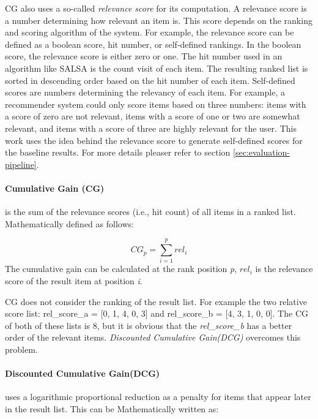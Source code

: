 CG also uses a so-called \emph{relevance score} for its computation. A relevance score is a number determining how relevant an item is. This score depends on the ranking and scoring algorithm of the system. For example, the relevance score can be defined as a boolean score, hit number, or self-defined rankings. In the boolean score, the relevance score is either zero or one. The hit number used in an algorithm like SALSA \cite{lempelSALSAStochasticApproach2001} is the count visit of each item. The resulting ranked list is sorted in descending order based on the hit number of each item. Self-defined scores are numbers determining the relevancy of each item. For example, a recommender system could only score items based on three numbers: items with a score of zero are not relevant, items with a score of one or two are somewhat relevant, and items with a score of three are highly relevant for the user. This work uses the idea behind the relevance score to generate self-defined scores for the baseline results. For more details pleaser refer to section \ref{sec:evaluation-pipeline}.


\paragraph*{Cumulative Gain (CG)}
is the sum of the relevance scores (i.e., hit count) of all items in a ranked list. Mathematically defined as follows:

\begin{equation}
    CG_p = \sum_{i=1}^{p}rel_i
    \label{eq:cg}
\end{equation}
The cumulative gain can be calculated at the rank position \emph{p}, \emph{$rel_i$} is the relevance score of the result item at position \emph{i}.

CG does not consider the ranking of the result list. For example the two relative score list: rel\_score\_a = [0, 1, 4, 0, 3] and rel\_score\_b = [4, 3, 1, 0, 0]. The CG of both of these lists is 8, but it is obvious that the \emph{rel\_score\_b} has a better order of the relevant items. \emph{Discounted Cumulative Gain(DCG)} overcomes this problem.

\paragraph*{Discounted Cumulative Gain(DCG)}
uses a logarithmic proportional reduction as a penalty for items that appear later in the result list. This can be Mathematically written as:

